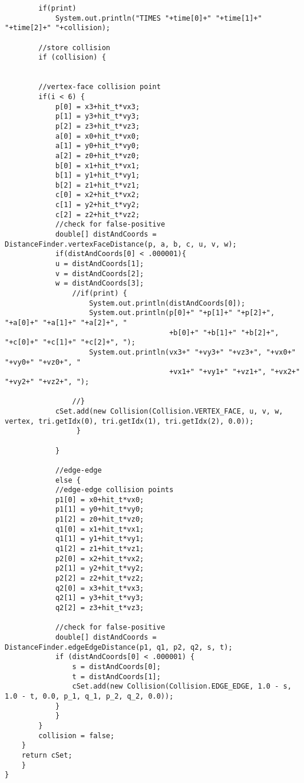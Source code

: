 \begin{lstlisting}
		if(print)
			System.out.println("TIMES "+time[0]+" "+time[1]+" "+time[2]+" "+collision);
				
	    //store collision
	    if (collision) {
			

		//vertex-face collision point
		if(i < 6) {
		    p[0] = x3+hit_t*vx3;
		    p[1] = y3+hit_t*vy3;
		    p[2] = z3+hit_t*vz3;
		    a[0] = x0+hit_t*vx0;
		    a[1] = y0+hit_t*vy0;
		    a[2] = z0+hit_t*vz0;
		    b[0] = x1+hit_t*vx1;
		    b[1] = y1+hit_t*vy1;
		    b[2] = z1+hit_t*vz1;
		    c[0] = x2+hit_t*vx2;
		    c[1] = y2+hit_t*vy2;
		    c[2] = z2+hit_t*vz2;
		    //check for false-positive
		    double[] distAndCoords = DistanceFinder.vertexFaceDistance(p, a, b, c, u, v, w);
		    if(distAndCoords[0] < .000001){
			u = distAndCoords[1];
			v = distAndCoords[2];
			w = distAndCoords[3];
				//if(print) {
					System.out.println(distAndCoords[0]);
					System.out.println(p[0]+" "+p[1]+" "+p[2]+", "+a[0]+" "+a[1]+" "+a[2]+", "
									   +b[0]+" "+b[1]+" "+b[2]+", "+c[0]+" "+c[1]+" "+c[2]+", ");
					System.out.println(vx3+" "+vy3+" "+vz3+", "+vx0+" "+vy0+" "+vz0+", "
									   +vx1+" "+vy1+" "+vz1+", "+vx2+" "+vy2+" "+vz2+", ");
					
				//}
			cSet.add(new Collision(Collision.VERTEX_FACE, u, v, w, vertex, tri.getIdx(0), tri.getIdx(1), tri.getIdx(2), 0.0));
				 }
					
		    }
				
		    //edge-edge
		    else {
			//edge-edge collision points
			p1[0] = x0+hit_t*vx0;
			p1[1] = y0+hit_t*vy0;
			p1[2] = z0+hit_t*vz0;
			q1[0] = x1+hit_t*vx1;	
			q1[1] = y1+hit_t*vy1;
			q1[2] = z1+hit_t*vz1;
			p2[0] = x2+hit_t*vx2;
			p2[1] = y2+hit_t*vy2;
			p2[2] = z2+hit_t*vz2;
			q2[0] = x3+hit_t*vx3;
			q2[1] = y3+hit_t*vy3;
			q2[2] = z3+hit_t*vz3;

			//check for false-positive
			double[] distAndCoords = DistanceFinder.edgeEdgeDistance(p1, q1, p2, q2, s, t);
			if (distAndCoords[0] < .000001) {
			    s = distAndCoords[0];
			    t = distAndCoords[1];
			    cSet.add(new Collision(Collision.EDGE_EDGE, 1.0 - s, 1.0 - t, 0.0, p_1, q_1, p_2, q_2, 0.0));
			}
		    }
	    }
	    collision = false;
	}
	return cSet;
    }
}\end{lstlisting}


